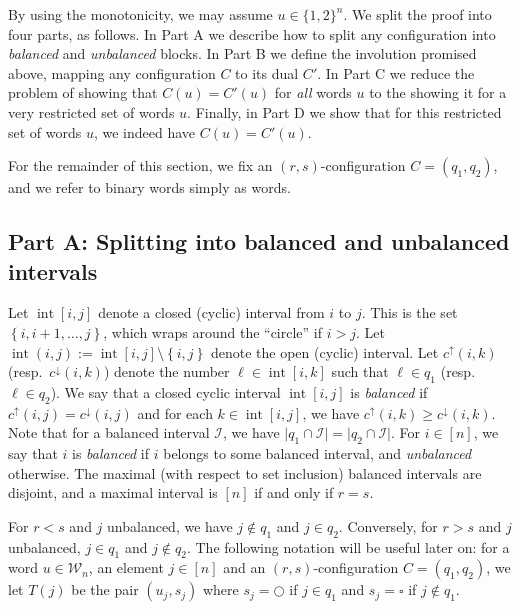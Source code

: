 \documentclass[reqno]{amsart}
\newcommand{\0}{\phantom{c}}
\DeclareMathOperator{\inter}{int} %
\newcommand{\mcW}{\mathcal{W}}
\newcommand{\mcI}{\mathcal{I}}
\newcommand{\set}[1]{\left\{ #1 \right\}}
\newcommand{\ive}[1]{\left[ #1 \right]}
\newcommand{\defn}[1]{{\color{darkred}\emph{#1}}} %
\theoremstyle{plain}
\theoremstyle{definition}
\numberwithin{equation}{section}
\begin{document}
By using the monotonicity, we may assume $u \in \{1,2\}^n$.
We split the proof into four parts, as follows.
In Part A we describe how to split any configuration into \defn{balanced} and \defn{unbalanced} blocks. In Part B we define the involution promised above, mapping any configuration $C$ to its dual $C'$.
In Part C we reduce the problem of showing that $C(u) = C'(u)$ for \emph{all} words $u$ to the showing it for a very restricted set of words $u$.
Finally, in Part D we show that for this restricted set of words $u$, we indeed have $C(u) = C'(u)$.

For the remainder of this section, we fix an $(r,s)$-configuration $C = (q_1, q_2)$, and we refer to binary words simply as words.

\subsection*{Part A: Splitting into balanced and unbalanced intervals}

Let $\inter[i,j]$ denote a closed (cyclic) interval from $i$ to $j$.
This is the set $\set{i, i+1, \ldots, j}$, which wraps around the ``circle'' if $i > j$.
Let $\inter(i,j) := \inter[i,j] \setminus \set{i,j}$ denote the open (cyclic) interval.
Let $c^{\uparrow}(i,k)$ (resp.~$c^{\downarrow}(i,k)$) denote the number $\ell \in \inter[i,k]$ such that $\ell \in q_1$ (resp.~$\ell \in q_2$).
We say that a closed cyclic interval $\inter[i,j]$ is \defn{balanced} if $c^{\uparrow}(i,j) = c^{\downarrow}(i,j)$ and for each $k \in \inter[i,j]$, we have $c^\uparrow(i,k) \geq c^\downarrow(i,k)$.
Note that for a balanced interval $\mcI$, we have $\lvert q_1 \cap \mcI \rvert = \lvert q_2 \cap \mcI \rvert$.
For $i \in \ive{n}$, we say that $i$ is \defn{balanced} if $i$ belongs to some balanced interval, and \defn{unbalanced} otherwise.
The maximal (with respect to set inclusion) balanced intervals are disjoint, and a maximal interval is $[n]$ if and only if $r = s$.

For $r < s$ and $j$ unbalanced, we have $j \notin q_1$ and $j \in q_2$.
Conversely, for $r > s$ and $j$ unbalanced, $j \in q_1$ and $j \notin q_2$.
The following notation will be useful later on: for a word $u \in \mcW_n$, an element $j \in \ive{n}$ and an $(r,s)$-configuration $C = (q_1, q_2)$, we let $T(j)$ be the pair $(u_j, s_j)$ where $s_j = \bigcirc$ if $j \in q_1$ and $s_j = \square$ if $j\notin q_1$.
\end{document}
